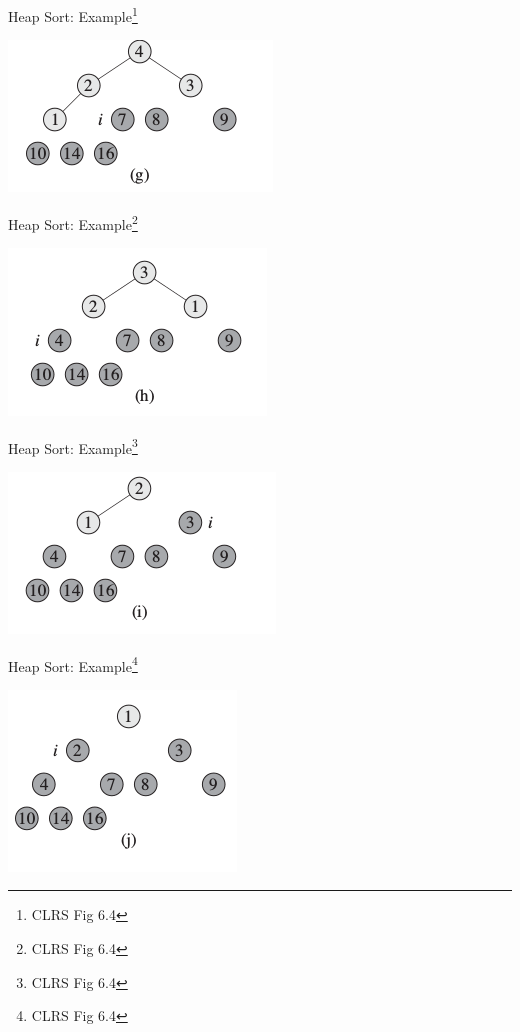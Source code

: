 \documentclass{beamer}
\begin{document}
\begin{frame}{Heap Sort: Example\footnote{CLRS Fig 6.4}}
    \begin{center}
        \includegraphics[scale=0.7]{heapSort7.png}
    \end{center}
\end{frame}


\begin{frame}{Heap Sort: Example\footnote{CLRS Fig 6.4}}
    \begin{center}
        \includegraphics[scale=0.7]{heapSort8.png}
    \end{center}
\end{frame}


\begin{frame}{Heap Sort: Example\footnote{CLRS Fig 6.4}}
    \begin{center}
        \includegraphics[scale=0.7]{heapSort9.png}
    \end{center}
\end{frame}


\begin{frame}{Heap Sort: Example\footnote{CLRS Fig 6.4}}
    \begin{center}
        \includegraphics[scale=0.7]{heapSort10.png}
    \end{center}
\end{frame}
\end{document}
